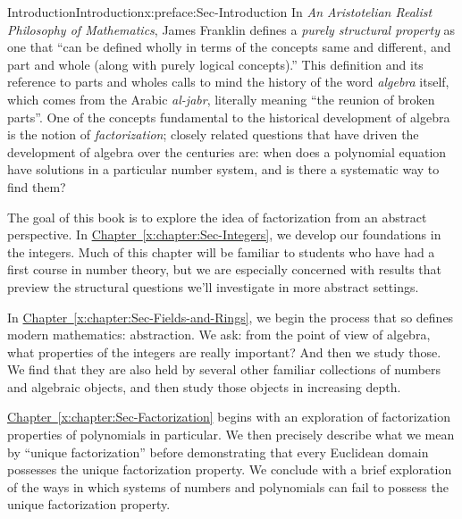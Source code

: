 \documentclass[oneside,10pt,]{book}
\newcommand{\xreffont}{\relax}
\numberwithin{equation}{section}
\begin{document}
\null%
%
%
\typeout{************************************************}
\typeout{************************************************}
%
\begin{preface}{Introduction}{}{Introduction}{}{}{x:preface:Sec-Introduction}
In \emph{An Aristotelian Realist Philosophy of Mathematics}, James Franklin defines a \emph{purely structural property} as one that ``can be defined wholly in terms of the concepts same and different, and part and whole (along with purely logical concepts).'' This definition and its reference to parts and wholes calls to mind the history of the word \emph{algebra} itself, which comes from the Arabic \emph{al-jabr}, literally meaning ``the reunion of broken parts''. One of the concepts fundamental to the historical development of algebra is the notion of \emph{factorization}; closely related questions that have driven the development of algebra over the centuries are: when does a polynomial equation have solutions in a particular number system, and is there a systematic way to find them?%
\par
The goal of this book is to explore the idea of factorization from an abstract perspective. In \hyperref[x:chapter:Sec-Integers]{Chapter~{\xreffont\ref{x:chapter:Sec-Integers}}}, we develop our foundations in the integers. Much of this chapter will be familiar to students who have had a first course in number theory, but we are especially concerned with results that preview the structural questions we'll investigate in more abstract settings.%
\par
In \hyperref[x:chapter:Sec-Fields-and-Rings]{Chapter~{\xreffont\ref{x:chapter:Sec-Fields-and-Rings}}}, we begin the process that so defines modern mathematics: abstraction. We ask: from the point of view of algebra, what properties of the integers are really important? And then we study those. We find that they are also held by several other familiar collections of numbers and algebraic objects, and then study those objects in increasing depth.%
\par
\hyperref[x:chapter:Sec-Factorization]{Chapter~{\xreffont\ref{x:chapter:Sec-Factorization}}} begins with an exploration of factorization properties of polynomials in particular. We then precisely describe what we mean by ``unique factorization'' before demonstrating that every Euclidean domain possesses the unique factorization property. We conclude with a brief exploration of the ways in which systems of numbers and polynomials can fail to possess the unique factorization property.%

\end{preface}
\end{document}
